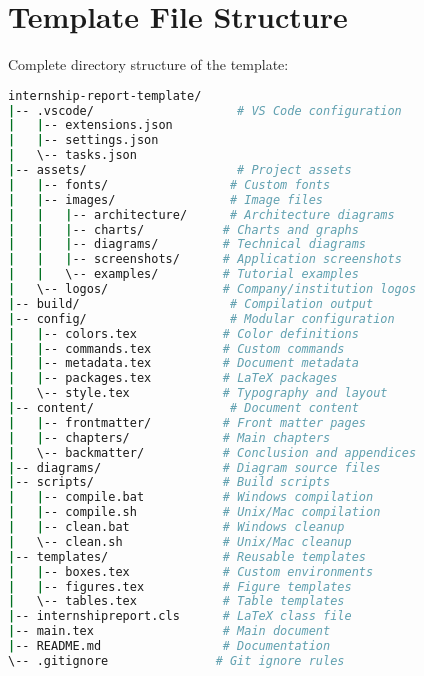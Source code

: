 \documentclass{internshipreport}
\begin{document}

\appendix

\chapter{Template File Structure}
\label{app:file-structure}

Complete directory structure of the template:

\begin{lstlisting}[language=bash, caption=Template Directory Structure]
internship-report-template/
|-- .vscode/                    # VS Code configuration
|   |-- extensions.json
|   |-- settings.json
|   \-- tasks.json
|-- assets/                     # Project assets
|   |-- fonts/                 # Custom fonts
|   |-- images/                # Image files
|   |   |-- architecture/      # Architecture diagrams
|   |   |-- charts/           # Charts and graphs
|   |   |-- diagrams/         # Technical diagrams
|   |   |-- screenshots/      # Application screenshots
|   |   \-- examples/         # Tutorial examples
|   \-- logos/                # Company/institution logos
|-- build/                     # Compilation output
|-- config/                    # Modular configuration
|   |-- colors.tex            # Color definitions
|   |-- commands.tex          # Custom commands
|   |-- metadata.tex          # Document metadata
|   |-- packages.tex          # LaTeX packages
|   \-- style.tex             # Typography and layout
|-- content/                   # Document content
|   |-- frontmatter/          # Front matter pages
|   |-- chapters/             # Main chapters
|   \-- backmatter/           # Conclusion and appendices
|-- diagrams/                 # Diagram source files
|-- scripts/                  # Build scripts
|   |-- compile.bat           # Windows compilation
|   |-- compile.sh            # Unix/Mac compilation
|   |-- clean.bat             # Windows cleanup
|   \-- clean.sh              # Unix/Mac cleanup
|-- templates/                # Reusable templates
|   |-- boxes.tex             # Custom environments
|   |-- figures.tex           # Figure templates
|   \-- tables.tex            # Table templates
|-- internshipreport.cls      # LaTeX class file
|-- main.tex                  # Main document
|-- README.md                 # Documentation
\-- .gitignore               # Git ignore rules
\end{lstlisting}
\end{document}
